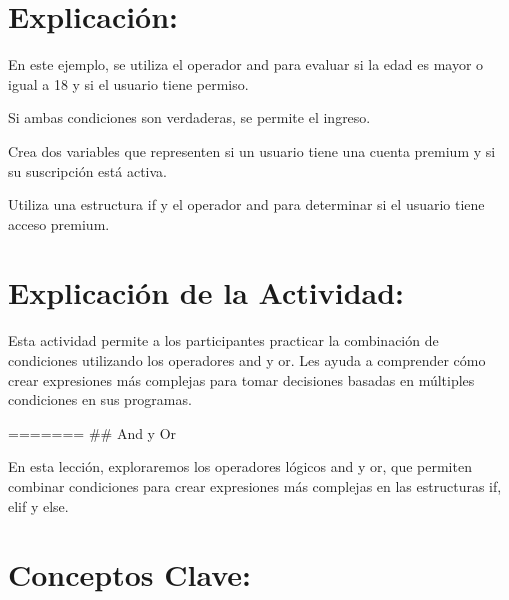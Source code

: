 \documentclass[
  a4paper,
  onepage,
  openany]{scrreprt}
\begin{document}
\hypertarget{explicaciuxf3n-34}{%
\section{Explicación:}\label{explicaciuxf3n-34}}

En este ejemplo, se utiliza el operador and para evaluar si la edad es
mayor o igual a 18 y si el usuario tiene permiso.

Si ambas condiciones son verdaderas, se permite el ingreso.

\begin{tcolorbox}[enhanced jigsaw, breakable, opacityback=0, toptitle=1mm, coltitle=black, toprule=.15mm, rightrule=.15mm, colframe=quarto-callout-important-color-frame, opacitybacktitle=0.6, arc=.35mm, title=\textcolor{quarto-callout-important-color}{\faExclamation}\hspace{0.5em}{Actividad Práctica:}, titlerule=0mm, colbacktitle=quarto-callout-important-color!10!white, bottomtitle=1mm, bottomrule=.15mm, colback=white, left=2mm, leftrule=.75mm]

Crea dos variables que representen si un usuario tiene una cuenta
premium y si su suscripción está activa.

Utiliza una estructura if y el operador and para determinar si el
usuario tiene acceso premium.

\end{tcolorbox}

\hypertarget{explicaciuxf3n-de-la-actividad-32}{%
\section{Explicación de la
Actividad:}\label{explicaciuxf3n-de-la-actividad-32}}

Esta actividad permite a los participantes practicar la combinación de
condiciones utilizando los operadores and y or. Les ayuda a comprender
cómo crear expresiones más complejas para tomar decisiones basadas en
múltiples condiciones en sus programas.

======= \#\# And y Or

En esta lección, exploraremos los operadores lógicos and y or, que
permiten combinar condiciones para crear expresiones más complejas en
las estructuras if, elif y else.

\hypertarget{conceptos-clave-35}{%
\section{Conceptos Clave:}\label{conceptos-clave-35}}
\end{document}
